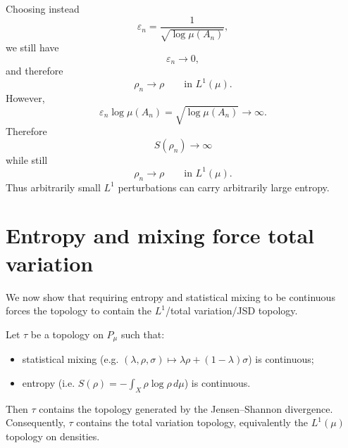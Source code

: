 \documentclass{techbrief}
\begin{document}
\begin{remark}
	Choosing instead
	\begin{equation}
		\varepsilon_n=\frac{1}{\sqrt{\log\mu(A_n)}},
	\end{equation}
	we still have
	\begin{equation}
		\varepsilon_n\to0,
	\end{equation}
	and therefore
	\begin{equation}
		\rho_n\to\rho
		\qquad\text{in }L^1(\mu).
	\end{equation}
	However,
	\begin{equation}
		\varepsilon_n\log\mu(A_n)
		=
		\sqrt{\log\mu(A_n)}
		\to\infty.
	\end{equation}
	Therefore
	\begin{equation}
		S(\rho_n)\to\infty
	\end{equation}
	while still
	\begin{equation}
		\rho_n\to\rho
		\qquad\text{in }L^1(\mu).
	\end{equation}
	Thus arbitrarily small $L^1$ perturbations can carry arbitrarily large entropy.
\end{remark}

\section{Entropy and mixing force total variation}

We now show that requiring entropy and statistical mixing to be continuous forces the topology to contain the $L^1$/total variation/JSD topology.

\begin{thrm}
	Let $\tau$ be a topology on $P_\mu$ such that:
	\begin{itemize}
		\item statistical mixing (e.g. $(\lambda,\rho,\sigma)
		\mapsto
		\lambda\rho+(1-\lambda)\sigma$) is continuous;
		\item entropy (i.e. $S(\rho)=-\int_X \rho\log\rho\,d\mu$) is continuous.
	\end{itemize}
	Then $\tau$ contains the topology generated by the Jensen--Shannon divergence. Consequently, $\tau$ contains the total variation topology, equivalently the $L^1(\mu)$ topology on densities.
\end{thrm}
\end{document}
